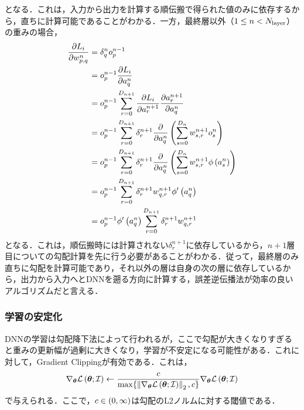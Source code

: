\documentclass[12pt]{jarticle}
\numberwithin{equation}{section}    %
\numberwithin{figure}{section}      %
\numberwithin{table}{section}      %
\begin{document}
となる．これは，入力から出力を計算する順伝搬で得られた値のみに依存するから，直ちに計算可能であることがわかる．一方，最終層以外（$1 \le n < N_{\text{layer}}$）の重みの場合，
\begin{align}
    \pdv{L_{i}}{w_{p, q}^{n}} & = \delta_{q}^{n} o_{p}^{n - 1}                                                                                                            \\
                                        & = o_{p}^{n - 1} \pdv{L_{i}}{a_{q}^{n}}                                                                                                    \\
                                        & = o_{p}^{n - 1} \sum_{r = 0}^{D_{n + 1}} \pdv{L_{i}}{a_{r}^{n + 1}} \pdv{a_{r}^{n + 1}}{a_{q}^{n}}                              \\
                                        & = o_{p}^{n - 1} \sum_{r = 0}^{D_{n + 1}} \delta_{r}^{n + 1} \pdv{a_{q}^{n}} \left(\sum_{s = 0}^{D_{n}} w_{s, r}^{n + 1} o_{s}^{n}\right)          \\
                                        & = o_{p}^{n - 1} \sum_{r = 0}^{D_{n + 1}} \delta_{r}^{n + 1} \pdv{a_{q}^{n}} \left(\sum_{s = 0}^{D_{n}} w_{s, r}^{n + 1} \phi\left(a_{s}^{n}\right)\right) \\
                                        & = o_{p}^{n - 1} \sum_{r = 0}^{D_{n + 1}} \delta_{r}^{n + 1} w_{q, r}^{n + 1} \phi'\left(a_{q}^{n}\right)                                          \\
                                        & = o_{p}^{n - 1} \phi'\left(a_{q}^{n}\right) \sum_{r = 0}^{D_{n + 1}} \delta_{r}^{n + 1} w_{q, r}^{n + 1}
\end{align}
となる．これは，順伝搬時には計算されない$\delta_{r}^{n + 1}$に依存しているから，$n + 1$層目についての勾配計算を先に行う必要があることがわかる．従って，最終層のみ直ちに勾配を計算可能であり，それ以外の層は自身の次の層に依存しているから，出力から入力へとDNNを遡る方向に計算する，誤差逆伝播法が効率の良いアルゴリズムだと言える．

\subsubsection{学習の安定化}
DNNの学習は勾配降下法によって行われるが，ここで勾配が大きくなりすぎると重みの更新幅が過剰に大きくなり，学習が不安定になる可能性がある．これに対して，Gradient Clippingが有効である．これは，
\begin{equation}
    \nabla_{\bm{\theta}} \mathcal{L}\left(\bm{\theta}; \mathcal{I}\right) \gets \frac{c}{\max \{\left\|\nabla_{\bm{\theta}} \mathcal{L}\left(\bm{\theta}; \mathcal{I}\right)\right\|_{2}, c\}} \nabla_{\bm{\theta}} \mathcal{L}\left(\bm{\theta}; \mathcal{I}\right)
\end{equation}
で与えられる．ここで，$c \in \left(0, \infty\right)$は勾配のL2ノルムに対する閾値である．
\end{document}
